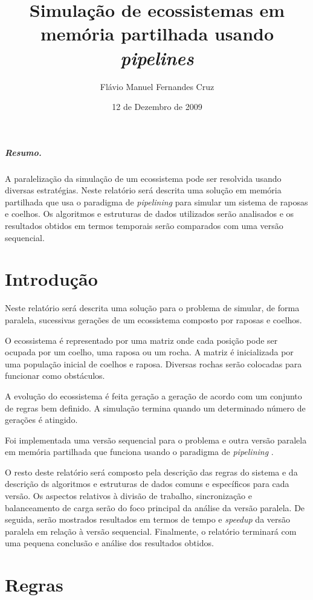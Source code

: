 \documentclass[12pt]{article}
\title{\bfseries Simulação de ecossistemas em memória partilhada usando \textit{pipelines}}
\author{Flávio Manuel Fernandes Cruz}
\date{12 de Dezembro de 2009}
\begin{document}
\maketitle

\subparagraph{Resumo.} A paralelização da simulação de um ecossistema pode ser resolvida usando diversas estratégias.
Neste relatório
será descrita uma solução em memória partilhada que usa o paradigma de \textit{pipelining} para simular um sistema
de raposas e coelhos. Os algoritmos e estruturas de dados utilizados serão analisados e os resultados
obtidos em termos temporais serão comparados com uma versão sequencial.

\section{Introdução}

Neste relatório será descrita uma solução para o problema de simular, de forma paralela,
sucessivas gerações de um ecossistema composto por raposas e coelhos.

O ecossistema é representado por uma matriz onde
cada posição pode ser ocupada por um coelho, uma raposa ou um rocha.
A matriz é inicializada por uma população inicial de coelhos e raposa.
Diversas rochas serão colocadas para funcionar como obstáculos.

A evolução do ecossistema é feita geração a geração de acordo com um conjunto de regras bem definido.
A simulação termina quando um determinado número de gerações é atingido.

Foi implementada uma versão sequencial para o problema e outra versão paralela em memória partilhada
que funciona usando o paradigma de \textit{pipelining} \cite{pipeline}.

O resto deste relatório será composto pela descrição das regras do sistema e da descrição
ds algoritmos e estruturas de dados comuns e específicos para cada versão.
Os aspectos relativos à divisão de trabalho, sincronização e balanceamento de carga
serão do foco principal da análise da versão paralela.
De seguida, serão mostrados resultados em termos de tempo
e \textit{speedup} da versão paralela em relação à versão sequencial. Finalmente,
o relatório terminará com uma pequena conclusão e análise dos resultados obtidos.

\section{Regras}
\end{document}
